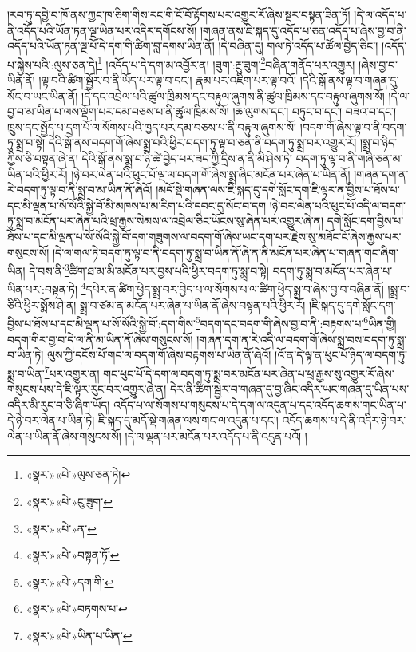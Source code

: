 །རབ་ཏུ་དབྱེ་བ་ཁོ་ནས་ཀྱང་ཁ་ཅིག་གིས་རང་གི་ངོ་བོ་རྟོགས་པར་འགྱུར་རོ་ཞེས་སྔར་བསྟན་ཟིན་ཏོ། །དེ་ལ་འདོད་པ་ནི་འདོད་པའི་ཡོན་ཏན་ལྔ་ཡིན་པར་འདིར་དགོངས་སོ། །གཞན་ནས་ཇི་སྐད་དུ་འདོད་པ་ཅན་འདོད་པ་ཞེས་བྱ་བ་ནི་འདོད་པའི་ཡོན་ཏན་ལྔ་པོ་དེ་དག་གི་ཚིག་བླ་དགས་ཡིན་ནོ། །དེ་བཞིན་དུ། གལ་ཏེ་འདོད་པ་ཚོལ་བྱེད་ཅིང་། །འདོད་པ་སྐྱེས་པའི་:ལུས་ཅན་དེ།\footnote{«སྣར་»«པེ་»ལུས་ཅན་ཏེ།} །འདོད་པ་དེ་དག་མ་འབྱོར་ན། །ཟུག་:རྔུ་ཟུག་\footnote{«སྣར་»«པེ་»ངུ་ཟུག་}བཞིན་གནོད་པར་འགྱུར། །ཞེས་བྱ་བ་ཡིན་ནོ། །ལྟ་བའི་ཚིག་སྦྱོར་བ་ནི་ཡོད་པར་ལྟ་བ་དང་། རྣམ་པར་འཇིག་པར་ལྟ་བའོ། །དེའི་སྒོ་ནས་ལྟ་བ་གཞན་དུ་སོང་བ་ཡང་ཡིན་ནོ། །དེ་དང་འབྲེལ་པའི་ཚུལ་ཁྲིམས་དང་བརྟུལ་ཞུགས་ནི་ཚུལ་ཁྲིམས་དང་བརྟུལ་ཞུགས་སོ། །དེ་ལ་བྱ་བ་མ་ཡིན་པ་ལས་ལྡོག་པར་དམ་བཅས་པ་ནི་ཚུལ་ཁྲིམས་སོ། །ཆ་ལུགས་དང་། བཏུང་བ་དང་། བཟའ་བ་དང་། ཁྲུས་དང་སྤྱོད་པ་དྲག་པོ་ལ་སོགས་པའི་ཁྱད་པར་དམ་བཅས་པ་ནི་བརྟུལ་ཞུགས་སོ། །བདག་གོ་ཞེས་ལྟ་བ་ནི་བདག་ཏུ་སྨྲ་བ་སྟེ། དེའི་སྒོ་ནས་བདག་གོ་ཞེས་སྨྲ་བའི་ཕྱིར་བདག་ཏུ་ལྟ་བ་ཅན་ནི་བདག་ཏུ་སྨྲ་བར་འགྱུར་རོ། །སྨྲ་བ་ཉིད་ཀྱིས་ཅི་བསྟན་ཞེ་ན། དེའི་སྒོ་ནས་སྨྲ་བ་ཉི་ཚེ་བྱེད་པར་ཟད་ཀྱི་དྲིས་ན་ནི་མི་ཤེས་ཏེ། བདག་ཏུ་ལྟ་བ་ནི་གཞི་ཅན་མ་ཡིན་པའི་ཕྱིར་རོ། །ཉེ་བར་ལེན་པའི་ཕུང་པོ་ལྔ་ལ་བདག་གོ་ཞེས་སྨྲ་ཞིང་མངོན་པར་ཞེན་པ་ཡིན་ནོ། །གཞན་དག་ན་རེ་བདག་ཏུ་ལྟ་བ་ནི་སྨྲ་བ་མ་ཡིན་ནོ་ཞེའོ། །མདོ་སྡེ་གཞན་ལས་ཇི་སྐད་དུ་དགེ་སློང་དག་ཇི་ལྟར་ན་བྱིས་པ་ཐོས་པ་དང་མི་ལྡན་པ་སོ་སོའི་སྐྱེ་བོ་མི་མཁས་པ་མ་རིག་པའི་དབང་དུ་སོང་བ་དག །ཉེ་བར་ལེན་པའི་ཕུང་པོ་འདི་ལ་བདག་ཏུ་སྨྲ་བ་མངོན་པར་ཞེན་པའི་ཕྲ་རྒྱས་སེམས་ལ་འབྲེལ་ཅིང་ཡོངས་སུ་ཞེན་པར་འགྱུར་ཞེ་ན། དགེ་སློང་དག་བྱིས་པ་ཐོས་པ་དང་མི་ལྡན་པ་སོ་སོའི་སྐྱེ་བོ་དག་གཟུགས་ལ་བདག་གོ་ཞེས་ཡང་དག་པར་རྗེས་སུ་མཐོང་ངོ་ཞེས་རྒྱས་པར་གསུངས་སོ། །དེ་ལ་གལ་ཏེ་བདག་ཏུ་ལྟ་བ་ནི་བདག་ཏུ་སྨྲ་བ་ཡིན་ནོ་ཞེ་ན་ནི་མངོན་པར་ཞེན་པ་གཞན་གང་ཞིག་ཡིན། དེ་བས་ནི་\footnote{«སྣར་»«པེ་»ན་}ཚིག་ཐ་མ་མི་མངོན་པར་བྱས་པའི་ཕྱིར་བདག་ཏུ་སྨྲ་བ་སྟེ། བདག་ཏུ་སྨྲ་བ་མངོན་པར་ཞེན་པ་ཡིན་པར་:བསྟན་ཏེ། \footnote{«སྣར་»«པེ་»བསྟན་ཏོ་}དཔེར་ན་ཚིག་ཕྱེད་སྨྲ་བར་བྱེད་པ་ལ་སོགས་པ་ལ་ཚིག་ཕྱེད་སྨྲ་བ་ཞེས་བྱ་བ་བཞིན་ནོ། །སྨྲ་བ་ཅིའི་ཕྱིར་སྨོས་ཤེ་ན། སྨྲ་བ་ཙམ་ན་མངོན་པར་ཞེན་པ་ཡིན་ནོ་ཞེས་བསྟན་པའི་ཕྱིར་རོ། །ཇི་སྐད་དུ་དགེ་སློང་དག་བྱིས་པ་ཐོས་པ་དང་མི་ལྡན་པ་སོ་སོའི་སྐྱེ་བོ་:དག་གིས་\footnote{«སྣར་»«པེ་»དག་གི་}བདག་དང་བདག་གི་ཞེས་བྱ་བ་ནི་:བརྟགས་པ་\footnote{«སྣར་»«པེ་»བཏགས་པ་}ཡིན་གྱི། བདག་གིར་བྱ་བ་དེ་ལ་ནི་མ་ཡིན་ནོ་ཞེས་གསུངས་སོ། །གཞན་དག་ན་རེ་འདི་ལ་བདག་གོ་ཞེས་སྨྲ་བས་བདག་ཏུ་སྨྲ་བ་ཡིན་ཏེ། ལུས་ཀྱི་དངོས་པོ་གང་ལ་བདག་གོ་ཞེས་བརྟགས་པ་ཡིན་ནོ་ཞེའོ། །འོ་ན་དེ་ལྟ་ན་ཕུང་པོ་ཉིད་ལ་བདག་ཏུ་སྨྲ་བ་ཡིན་\footnote{«སྣར་»«པེ་»ཡིན་པ་ཡིན་}པར་འགྱུར་ན། གང་ཕུང་པོ་དེ་དག་ལ་བདག་ཏུ་སྨྲ་བར་མངོན་པར་ཞེན་པ་ཕྲ་རྒྱས་སུ་འགྱུར་རོ་ཞེས་གསུངས་པས་དེ་ཇི་ལྟར་རུང་བར་འགྱུར་ཞེ་ན། དེར་ནི་ཚིག་སྦྱར་བ་གཞན་དུ་བྱ་ཞིང་འདིར་ཡང་གཞན་དུ་ཡིན་པས་འདིར་མི་རུང་བ་ཅི་ཞིག་ཡོད། འདོད་པ་ལ་སོགས་པ་གསུངས་པ་དེ་དག་ལ་འདུན་པ་དང་འདོད་ཆགས་གང་ཡིན་པ་དེ་ཉེ་བར་ལེན་པ་ཡིན་ཏེ། ཇི་སྐད་དུ་མདོ་སྡེ་གཞན་ལས་གང་ལ་འདུན་པ་དང་། འདོད་ཆགས་པ་དེ་ནི་འདིར་ཉེ་བར་ལེན་པ་ཡིན་ནོ་ཞེས་གསུངས་སོ། །དེ་ལ་ལྡན་པར་མངོན་པར་འདོད་པ་ནི་འདུན་པའོ། །
